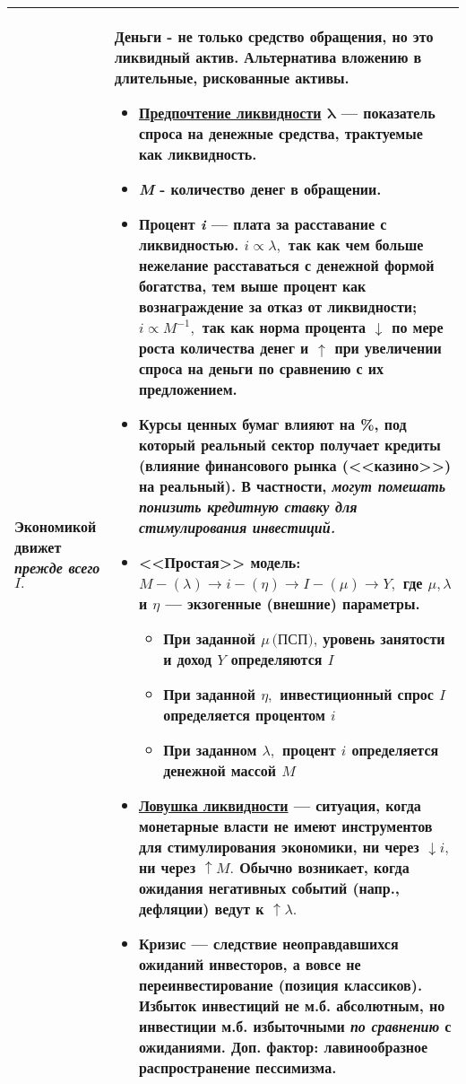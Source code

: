 \documentclass[a4paper]{article}
\begin{document}
\begin{center}
\begin{tabular}{|p{}|p{}|}
Экономикой движет \emph{прежде всего} $I.$
&
Деньги - не только средство обращения, но это ликвидный актив. Альтернатива вложению в длительные, рискованные активы.

\begin{itemize}
\item \textbf{\href{http://ru.wikipedia.org/wiki/\%D0\%9F\%D1\%80\%D0\%B5\%D0\%B4\%D0\%BF\%D0\%BE\%D1\%87\%D1\%82\%D0\%B5\%D0\%BD\%D0\%B8\%D0\%B5_\%D0\%BB\%D0\%B8\%D0\%BA\%D0\%B2\%D0\%B8\%D0\%B4\%D0\%BD\%D0\%BE\%D1\%81\%D1\%82\%D0\%B8}{Предпочтение ликвидности} $\bm{\lambda}$} --- показатель спроса на денежные средства, трактуемые как ликвидность.
\item \textbf{\textit{M}} - количество денег в обращении.
\item \textbf{Процент \textit{i}} --- плата за расставание с ликвидностью. $i \varpropto \lambda,$ так как чем больше нежелание расставаться с денежной формой богатства, тем выше процент как вознаграждение за отказ от ликвидности; $i\varpropto M^{-1},$ так как норма процента $\downarrow$ по мере роста количества
денег и $\uparrow$ при увеличении спроса на деньги по сравнению с их предложением.
\item Курсы ценных бумаг влияют на \%, под который реальный сектор получает кредиты (влияние финансового рынка  (<<казино>>) на реальный). В частности, \emph{могут помешать понизить кредитную ставку для стимулирования инвестиций.}
\item <<Простая>> модель: $M - (\lambda) \rightarrow i - (\eta) \rightarrow I - (\mu) \rightarrow Y,$ где $\mu, \lambda$ и $\eta$ --- экзогенные (внешние) параметры.
\begin{itemize}
\item При заданной $\mu\, \text{(ПСП),}$ уровень занятости и доход $Y$ определяются $I$
\item При заданной $\eta,$ инвестиционный спрос $I$ определяется процентом $i$
\item При заданном $\lambda,$ процент $i$ определяется денежной массой $M$
\end{itemize}
\item \textbf{\href{http://ru.wikipedia.org/wiki/\%D0\%9B\%D0\%BE\%D0\%B2\%D1\%83\%D1\%88\%D0\%BA\%D0\%B0_\%D0\%BB\%D0\%B8\%D0\%BA\%D0\%B2\%D0\%B8\%D0\%B4\%D0\%BD\%D0\%BE\%D1\%81\%D1\%82\%D0\%B8}{Ловушка ликвидности}} --- ситуация, когда монетарные власти не имеют инструментов для стимулирования экономики, ни через $\downarrow i,$  ни через $\uparrow M.$ Обычно возникает, когда ожидания негативных событий (напр., дефляции) ведут к $\uparrow\lambda.$
\item \textbf{Кризис} --- следствие неоправдавшихся ожиданий инвесторов, а вовсе не переинвестирование (позиция классиков). Избыток инвестиций не м.б. абсолютным, но инвестиции м.б. избыточными \emph{по сравнению} с ожиданиями. Доп. фактор: лавинообразное распространение пессимизма.
\end{itemize}\\
\hline
\end{tabular}
\end{center}
\end{document}
